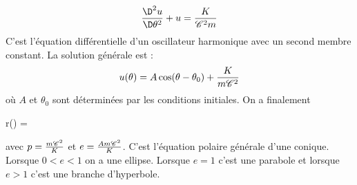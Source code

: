\documentclass{cours}
\begin{document}
\begin{equation}
  \frac{\D^2u}{\D\theta^2} + u = \frac{K}{\cc^2m}
\end{equation}
C'est l'équation différentielle d'un oscillateur harmonique avec un second membre constant. La solution générale est :
\begin{equation}
  u(\theta) = A\cos(\theta-\theta_0) + \frac{K}{m\mathscr{C}^2} 
\end{equation}
où $A$ et $\theta_0$ sont déterminées par les conditions initiales. On a finalement
\begin{eqencadre}
  r(\theta) = 
\end{eqencadre}
avec $p=\frac{m\mathscr{C}^2}{K}$ et $e=\frac{Am\mathscr{C}^2}{K}$. C'est l'équation polaire générale d'une conique. Lorsque $0<e<1$ on a une ellipse. Lorsque $e=1$ c'est une parabole et lorsque $e>1$ c'est une branche d'hyperbole.
\end{document}
